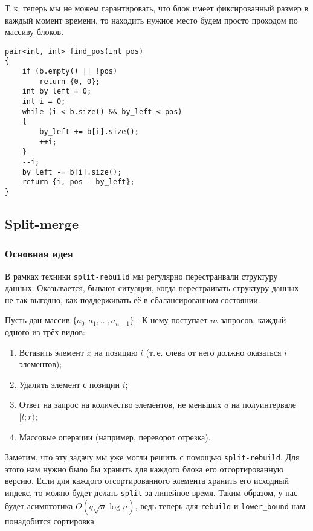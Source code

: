 Т.\,к. теперь мы не можем гарантировать, что блок имеет фиксированный размер в каждый момент времени, то находить нужное место будем просто проходом по массиву блоков.

\begin{verbatim}
pair<int, int> find_pos(int pos)
{
    if (b.empty() || !pos)
        return {0, 0};
    int by_left = 0;
    int i = 0;
    while (i < b.size() && by_left < pos)
    {
        by_left += b[i].size();
        ++i;
    }
    --i;
    by_left -= b[i].size();
    return {i, pos - by_left};
}
\end{verbatim}

\subsection{Split-merge}

\subsubsection{Основная идея}

В рамках техники \texttt{split-rebuild} мы регулярно перестраивали структуру данных. Оказывается, бывают ситуации, когда перестраивать структуру данных не так выгодно, как поддерживать её в сбалансированном состоянии.

\begin{problem}
    Пусть дан массив $\{a_0, a_1, \ldots, a_{n - 1}\}$ . К нему поступает $m$ запросов, каждый одного из трёх видов:

    \begin{enumerate}[nolistsep]
        \item Вставить элемент $x$ на позицию $i$ (т.\,е. слева от него должно оказаться $i$ элементов);
        \item Удалить элемент с позиции $i$;
        \item Ответ на запрос на количество элементов, не меньших $a$ на полуинтервале $[l; r)$;
        \item Массовые операции (например, переворот отрезка).
    \end{enumerate}
\end{problem}

Заметим, что эту задачу мы уже могли решить с помощью \texttt{split-rebuild}. Для этого нам нужно было бы хранить для каждого блока его отсортированную версию. Если для каждого отсортированного элемента хранить его исходный индекс, то можно будет делать \texttt{split} за линейное время. Таким образом, у нас будет асимптотика $O(q\sqrt{n}\log n)$, ведь теперь для \texttt{rebuild} и \texttt{lower\_bound} нам понадобится сортировка.

